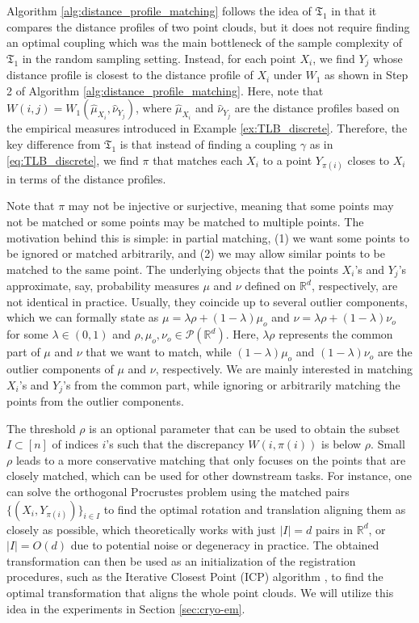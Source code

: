 \documentclass[11pt,letterpaper]{article}
\theoremstyle{definition}
\numberwithin{equation}{section}
\newcommand{\R}{\mathbb{R}}
\begin{document}
Algorithm \ref{alg:distance_profile_matching} follows the idea of $\mathfrak{T}_1$ in that it compares the distance profiles of two point clouds, but it does not require finding an optimal coupling which was the main bottleneck of the sample complexity of $\mathfrak{T}_1$ in the random sampling setting. Instead, for each point $X_i$, we find $Y_j$ whose distance profile is closest to the distance profile of $X_i$ under $W_1$ as shown in Step 2 of Algorithm \ref{alg:distance_profile_matching}. Here, note that $W(i, j) = W_1(\hat{\mu}_{X_i}, \hat{\nu}_{Y_j})$, where $\hat{\mu}_{X_i}$ and $\hat{\nu}_{Y_j}$ are the distance profiles based on the empirical measures introduced in Example \ref{ex:TLB_discrete}. Therefore, the key difference from $\mathfrak{T}_1$ is that instead of finding a coupling $\gamma$ as in \eqref{eq:TLB_discrete}, we find $\pi$ that matches each $X_i$ to a point $Y_{\pi(i)}$ closes to $X_i$ in terms of the distance profiles. 

Note that $\pi$ may not be injective or surjective, meaning that some points may not be matched or some points may be matched to multiple points. The motivation behind this is simple: in partial matching, (1) we want some points to be ignored or matched arbitrarily, and (2) we may allow similar points to be matched to the same point. The underlying objects that the points $X_i$'s and $Y_j$'s approximate, say, probability measures $\mu$ and $\nu$ defined on $\R^d$, respectively, are not identical in practice. Usually, they coincide up to several outlier components, which we can formally state as $\mu = \lambda \rho + (1 - \lambda) \mu_o$ and $\nu = \lambda \rho + (1 - \lambda) \nu_o$ for some $\lambda \in (0, 1)$ and $\rho, \mu_o, \nu_o \in \mathscr{P}(\R^d)$. Here, $\lambda \rho$ represents the common part of $\mu$ and $\nu$ that we want to match, while $(1 - \lambda) \mu_o$ and $(1 - \lambda) \nu_o$ are the outlier components of $\mu$ and $\nu$, respectively. We are mainly interested in matching $X_i$'s and $Y_j$'s from the common part, while ignoring or arbitrarily matching the points from the outlier components.

The threshold $\rho$ is an optional parameter that can be used to obtain the subset $I \subset [n]$ of indices $i$'s such that the discrepancy $W(i, \pi(i))$ is below $\rho$. Small $\rho$ leads to a more conservative matching that only focuses on the points that are closely matched, which can be used for other downstream tasks. For instance, one can solve the orthogonal Procrustes problem \citep{wahba1965least,yang2019quaternion} using the matched pairs $\{(X_i, Y_{\pi(i)})\}_{i \in I}$ to find the optimal rotation and translation aligning them as closely as possible, which theoretically works with just $|I| = d$ pairs in $\R^d$, or $|I| = O(d)$ due to potential noise or degeneracy in practice. The obtained transformation can then be used as an initialization of the registration procedures, such as the Iterative Closest Point (ICP) algorithm \citep{besl1992method}, to find the optimal transformation that aligns the whole point clouds. We will utilize this idea in the experiments in Section \ref{sec:cryo-em}.
\end{document}
